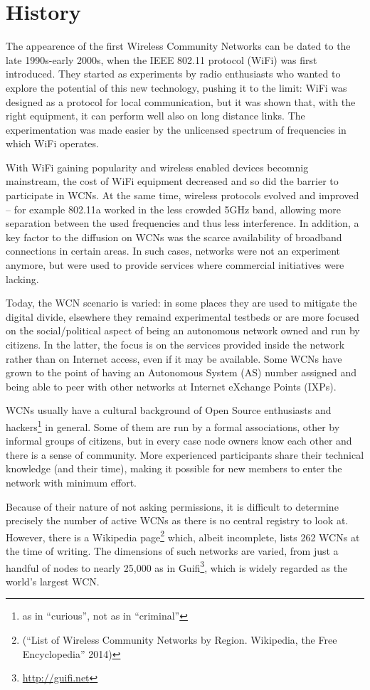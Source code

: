\documentclass[oneside,openany]{memoir}
\begin{document}
\section{History}\label{history}

The appearence of the first Wireless Community Networks can be dated to
the late 1990s-early 2000s, when the IEEE 802.11 protocol (WiFi) was
first introduced. They started as experiments by radio enthusiasts who
wanted to explore the potential of this new technology, pushing it to
the limit: WiFi was designed as a protocol for local communication, but
it was shown that, with the right equipment, it can perform well also on
long distance links. The experimentation was made easier by the
unlicensed spectrum of frequencies in which WiFi operates.

With WiFi gaining popularity and wireless enabled devices becomnig
mainstream, the cost of WiFi equipment decreased and so did the barrier
to participate in WCNs. At the same time, wireless protocols evolved and
improved -- for example 802.11a worked in the less crowded 5GHz band,
allowing more separation between the used frequencies and thus less
interference. In addition, a key factor to the diffusion on WCNs was the
scarce availability of broadband connections in certain areas. In such
cases, networks were not an experiment anymore, but were used to provide
services where commercial initiatives were lacking.

Today, the WCN scenario is varied: in some places they are used to
mitigate the digital divide, elsewhere they remaind experimental
testbeds or are more focused on the social/political aspect of being an
autonomous network owned and run by citizens. In the latter, the focus
is on the services provided inside the network rather than on Internet
access, even if it may be available. Some WCNs have grown to the point
of having an Autonomous System (AS) number assigned and being able to
peer with other networks at Internet eXchange Points (IXPs).

WCNs usually have a cultural background of Open Source enthusiasts and
hackers\footnote{as in ``curious'', not as in ``criminal''} in general.
Some of them are run by a formal associations, other by informal groups
of citizens, but in every case node owners know each other and there is
a sense of community. More experienced participants share their
technical knowledge (and their time), making it possible for new members
to enter the network with minimum effort.

Because of their nature of not asking permissions, it is difficult to
determine precisely the number of active WCNs as there is no central
registry to look at. However, there is a Wikipedia page\footnote{(``List
  of Wireless Community Networks by Region. Wikipedia, the Free
  Encyclopedia'' 2014)} which, albeit incomplete, lists 262 WCNs at the
time of writing. The dimensions of such networks are varied, from just a
handful of nodes to nearly 25,000 as in Guifi\footnote{\url{http://guifi.net}},
which is widely regarded as the world's largest WCN.
\end{document}
